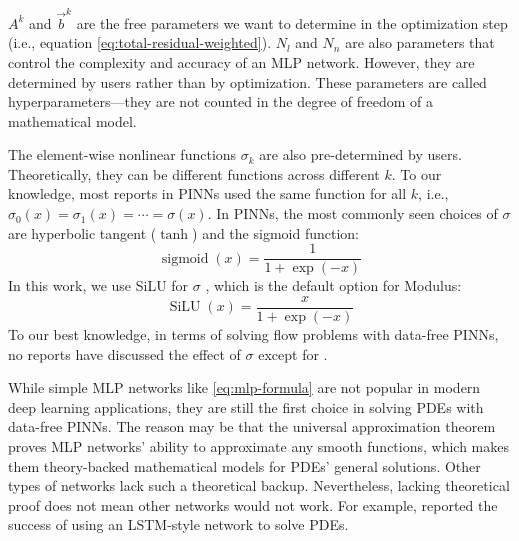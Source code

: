 $A^k$ and $\vec{b}^k$ are the free parameters we want to determine in the optimization step (i.e., equation \eqref{eq:total-residual-weighted}).
$N_l$ and $N_n$ are also parameters that control the complexity and accuracy of an MLP network.
However, they are determined by users rather than by optimization.
These parameters are called hyperparameters---they are not counted in the degree of freedom of a mathematical model.

The element-wise nonlinear functions $\sigma_{k}$ are also pre-determined by users.
Theoretically, they can be different functions across different $k$.
To our knowledge, most reports in PINNs used the same function for all $k$, i.e., $\sigma_0(x)=\sigma_1(x)=\cdots=\sigma(x)$.
In PINNs, the most commonly seen choices of $\sigma$ are hyperbolic tangent ($\tanh$) and the sigmoid function:
\begin{equation}
    \operatorname{sigmoid}(x) = \frac{1}{1+\exp(-x)}
\end{equation}
In this work, we use SiLU for $\sigma$ \cite{hendrycks_gaussian_2020}, which is the default option for Modulus:
\begin{equation}\label{eq:silu}
    \operatorname{SiLU}(x) = \frac{x}{1+\exp(-x)}
\end{equation}
To our best knowledge, in terms of solving flow problems with data-free PINNs, no reports have discussed the effect of $\sigma$ except for \cite{li_integration_2010}.

While simple MLP networks like \eqref{eq:mlp-formula} are not popular in modern deep learning applications, they are still the first choice in solving PDEs with data-free PINNs.
The reason may be that the universal approximation theorem proves MLP networks' ability to approximate any smooth functions, which makes them theory-backed mathematical models for PDEs' general solutions.
Other types of networks lack such a theoretical backup.
Nevertheless, lacking theoretical proof does not mean other networks would not work.
For example, \cite{sirignano_dgm:_2018} reported the success of using an LSTM-style network to solve PDEs.

